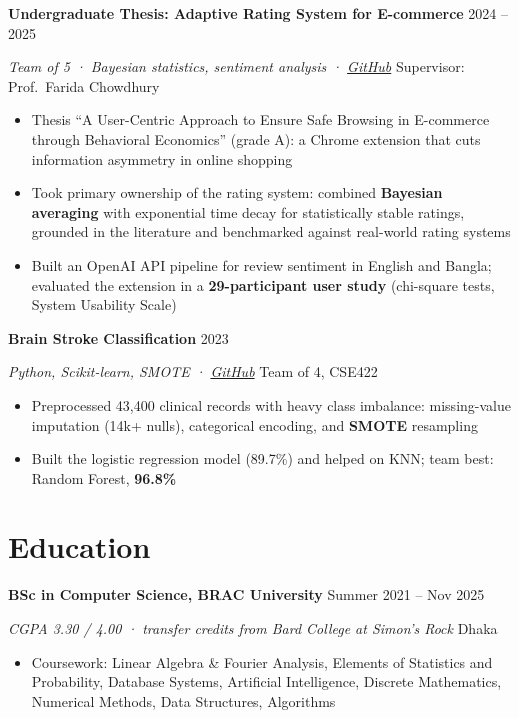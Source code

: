 \documentclass[11pt]{article}
\newcommand{\entry}[2]{\textbf{#1} \hfill {\small #2}\par}
\newcommand{\subentry}[2]{\textit{#1} \hfill {\small #2}\par}
\begin{document}
\entry{Undergraduate Thesis: Adaptive Rating System for E-commerce}{2024 -- 2025}
\subentry{Team of 5 \;·\; Bayesian statistics, sentiment analysis \;·\; \href{https://github.com/isttiiak/e-commerce-extension}{GitHub}}{Supervisor: Prof.\ Farida Chowdhury}
\begin{itemize}
  \item Thesis ``A User-Centric Approach to Ensure Safe Browsing in E-commerce through Behavioral Economics'' (grade A): a Chrome extension that cuts information asymmetry in online shopping
  \item Took primary ownership of the rating system: combined \textbf{Bayesian averaging} with exponential time decay for statistically stable ratings, grounded in the literature and benchmarked against real-world rating systems
  \item Built an OpenAI API pipeline for review sentiment in English and Bangla; evaluated the extension in a \textbf{29-participant user study} (chi-square tests, System Usability Scale)
\end{itemize}
\vspace{5pt}

\entry{Brain Stroke Classification}{2023}
\subentry{Python, Scikit-learn, SMOTE \;·\; \href{https://github.com/RejwanShafi25/Brain-stroke-analysis-and-classification--CSE422-Project}{GitHub}}{Team of 4, CSE422}
\begin{itemize}
  \item Preprocessed 43,400 clinical records with heavy class imbalance: missing-value imputation (14k+ nulls), categorical encoding, and \textbf{SMOTE} resampling
  \item Built the logistic regression model (89.7\%) and helped on KNN; team best: Random Forest, \textbf{96.8\%}
\end{itemize}

\section{Education}

\entry{BSc in Computer Science, BRAC University}{Summer 2021 -- Nov 2025}
\subentry{CGPA 3.30 / 4.00 \;· transfer credits from Bard College at Simon's Rock}{Dhaka}
\begin{itemize}
  \item Coursework: Linear Algebra \& Fourier Analysis, Elements of Statistics and Probability, Database Systems, Artificial Intelligence, Discrete Mathematics, Numerical Methods, Data Structures, Algorithms
\end{itemize}
\vspace{5pt}
\end{document}
